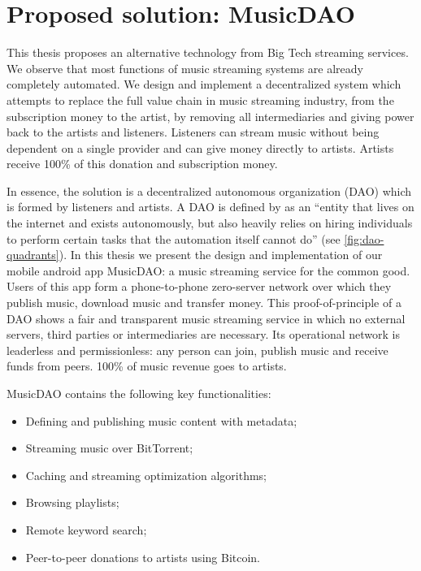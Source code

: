 \section{Proposed solution: MusicDAO}
This thesis proposes an alternative technology from Big Tech streaming services. We observe that most functions of music streaming systems are already completely automated.
We design and implement a decentralized system which attempts to replace the full value chain in music streaming industry, from the subscription money to the artist, by removing all intermediaries and giving power back to the artists and listeners. Listeners can stream music without being dependent on a single provider and can give money directly to artists. Artists receive 100\% of this donation and subscription money.

In essence, the solution is a decentralized autonomous organization (DAO) which is formed by listeners and artists. A DAO is defined by \cite{buterin2014dao} as an ``entity that lives on the internet and exists autonomously, but also heavily relies on hiring individuals to perform certain tasks that the automation itself cannot do'' (see \ref{fig:dao-quadrants}). In this thesis we present the design and implementation of our mobile android app MusicDAO: a music streaming service for the common good. Users of this app form a phone-to-phone zero-server network over which they publish music, download music and transfer money. This proof-of-principle of a DAO shows a fair and transparent music streaming service in which no external servers, third parties or intermediaries are necessary. Its operational network is leaderless and permissionless: any person can join, publish music and receive funds from peers. 100\% of music revenue goes to artists.

MusicDAO contains the following key functionalities:
\begin{itemize}
    \item Defining and publishing music content with metadata;
    \item Streaming music over BitTorrent;
    \item Caching and streaming optimization algorithms;
    \item Browsing playlists;
    \item Remote keyword search;
    \item Peer-to-peer donations to artists using Bitcoin.
\end{itemize}


